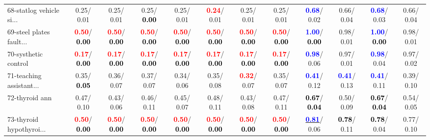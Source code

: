 \begin{table}[h]
\begin{center}
{\begin{tabular}{lc|c|c|c|c|c|c|c|c|c|c}
68-statlog vehicle si... &   0.25/  0.01 &   0.25/  0.01 &   0.25/\textcolor{black}{\textbf{  0.00}} &   0.25/  0.01 & \textcolor{red}{\textbf{  0.24}}/  0.01 &   0.25/  0.01 &   0.25/  0.01 & \textcolor{blue}{\textbf{  0.68}}/  0.02 &   0.66/  0.04 & \textcolor{blue}{\textbf{  0.68}}/  0.03 &   0.66/  0.04 \\
69-steel plates fault... & \textcolor{red}{\textbf{  0.50}}/\textcolor{black}{\textbf{  0.00}} & \textcolor{red}{\textbf{  0.50}}/\textcolor{black}{\textbf{  0.00}} & \textcolor{red}{\textbf{  0.50}}/\textcolor{black}{\textbf{  0.00}} & \textcolor{red}{\textbf{  0.50}}/\textcolor{black}{\textbf{  0.00}} & \textcolor{red}{\textbf{  0.50}}/\textcolor{black}{\textbf{  0.00}} & \textcolor{red}{\textbf{  0.50}}/\textcolor{black}{\textbf{  0.00}} & \textcolor{red}{\textbf{  0.50}}/\textcolor{black}{\textbf{  0.00}} & \textcolor{blue}{\textbf{  1.00}}/\textcolor{black}{\textbf{  0.00}} &   0.98/  0.01 & \textcolor{blue}{\textbf{  1.00}}/\textcolor{black}{\textbf{  0.00}} &   0.98/  0.01 \\
70-systhetic control & \textcolor{red}{\textbf{  0.17}}/\textcolor{black}{\textbf{  0.00}} & \textcolor{red}{\textbf{  0.17}}/\textcolor{black}{\textbf{  0.00}} & \textcolor{red}{\textbf{  0.17}}/\textcolor{black}{\textbf{  0.00}} & \textcolor{red}{\textbf{  0.17}}/\textcolor{black}{\textbf{  0.00}} & \textcolor{red}{\textbf{  0.17}}/\textcolor{black}{\textbf{  0.00}} & \textcolor{red}{\textbf{  0.17}}/\textcolor{black}{\textbf{  0.00}} & \textcolor{red}{\textbf{  0.17}}/\textcolor{black}{\textbf{  0.00}} & \textcolor{blue}{\textbf{  0.98}}/  0.06 &   0.97/  0.01 & \textcolor{blue}{\textbf{  0.98}}/  0.04 &   0.97/  0.02 \\
71-teaching assistant... &   0.35/\textcolor{black}{\textbf{  0.05}} &   0.36/  0.07 &   0.37/  0.07 &   0.34/  0.06 &   0.35/  0.08 & \textcolor{red}{\textbf{  0.32}}/  0.07 &   0.35/  0.07 & \textcolor{blue}{\textbf{  0.41}}/  0.12 & \textcolor{blue}{\textbf{  0.41}}/  0.13 & \textcolor{blue}{\textbf{  0.41}}/  0.11 &   0.39/  0.10 \\ \hline
72-thyroid ann &   0.47/  0.10 &   0.43/  0.06 &   0.46/  0.11 &   0.45/  0.07 &   0.48/  0.11 &   0.43/  0.08 &   0.47/  0.11 & \textcolor{black}{\textbf{  0.67}}/\textcolor{black}{\textbf{  0.04}} &   0.50/  0.09 & \textcolor{black}{\textbf{  0.67}}/\textcolor{black}{\textbf{  0.04}} &   0.54/  0.05 \\
73-thyroid hypothyroi... & \textcolor{red}{\textbf{  0.50}}/\textcolor{black}{\textbf{  0.00}} & \textcolor{red}{\textbf{  0.50}}/\textcolor{black}{\textbf{  0.00}} & \textcolor{red}{\textbf{  0.50}}/\textcolor{black}{\textbf{  0.00}} & \textcolor{red}{\textbf{  0.50}}/\textcolor{black}{\textbf{  0.00}} & \textcolor{red}{\textbf{  0.50}}/\textcolor{black}{\textbf{  0.00}} & \textcolor{red}{\textbf{  0.50}}/\textcolor{black}{\textbf{  0.00}} & \textcolor{red}{\textbf{  0.50}}/\textcolor{black}{\textbf{  0.00}} & \underline{\textcolor{blue}{\textbf{  0.81}}}/  0.06 & \textcolor{black}{\textbf{  0.78}}/  0.11 & \textcolor{black}{\textbf{  0.78}}/  0.04 &   0.77/  0.10 \\

\end{tabular}}
\end{center}
\end{table}
